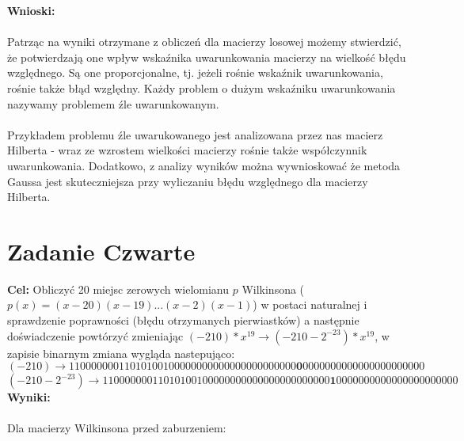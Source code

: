 \documentclass{article}
\begin{document}
\newpage
\noindent \textbf{Wnioski:} \\\\
Patrząc na wyniki otrzymane z obliczeń dla macierzy losowej możemy stwierdzić, że potwierdzają one wpływ wskaźnika uwarunkowania macierzy na wielkość błędu względnego. Są one proporcjonalne, tj. jeżeli rośnie wskaźnik uwarunkowania, rośnie także błąd względny. Każdy problem o dużym wskaźniku uwarunkowania nazywamy problemem źle uwarunkowanym.\\\\
Przykładem problemu źle uwarukowanego jest analizowana przez nas macierz Hilberta - wraz ze wzrostem wielkości macierzy rośnie także współczynnik uwarunkowania. Dodatkowo, z analizy wyników można wywnioskować że metoda Gaussa jest skuteczniejsza przy wyliczaniu błędu względnego dla macierzy Hilberta.
\section*{Zadanie Czwarte}
\noindent \textbf{Cel:} Obliczyć 20 miejsc zerowych wielomianu $p$ Wilkinsona ($p(x) = (x-20)(x-19)...(x-2)(x-1)$) w postaci naturalnej i sprawdzenie poprawności (błędu otrzymanych pierwiastków) a następnie doświadczenie powtórzyć zmieniając $(-210)*x^{19} \rightarrow (-210-2^{-23})*x^{19}$, w zapisie binarnym zmiana wygląda nastepująco:
$$ (-210) \rightarrow  11000000011010100100000000000000000000000\textbf{0}0000000000000000000000$$
$$ (-210-2^{-23}) \rightarrow 11000000011010100100000000000000000000000\textbf{1}0000000000000000000000$$
\noindent \textbf{Wyniki:} \\\\
Dla macierzy Wilkinsona przed zaburzeniem:
\end{document}

